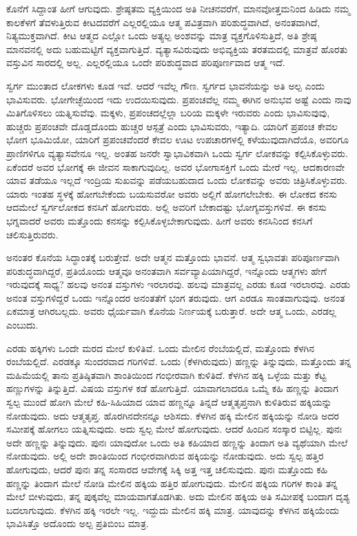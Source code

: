 ಕೊನೆಗೆ ಸಿದ್ದಾಂತ ಹೀಗೆ ಆಗುವುದು. ಶ್ರೇಷ್ಠತಮ ವ್ಯಕ್ತಿಯಿಂದ ಅತಿ ನೀಚನವರೆಗೆ, ಮಾನವೋತ್ತಮನಿಂದ ಹಿಡಿದು ನಮ್ಮ ಕಾಲಕೆಳಗೆ ತೆವಳುತ್ತಿರುವ ಕೀಟದವರೆಗೆ ಎಲ್ಲರಲ್ಲಿಯೂ ಆತ್ಮ ಪವಿತ್ರವಾಗಿ ಪರಿಶುದ್ಧವಾಗಿದೆ, ಅನಂತವಾಗಿದೆ, ನಿತ್ಯಮುಕ್ತವಾಗಿದೆ. ಕೀಟ ಆತ್ಮದ ಎಲ್ಲೋ ಒಂದು ಅತ್ಯಲ್ಪ ಅಂಶವನ್ನು ಮಾತ್ರ ವ್ಯಕ್ತಗೊಳಿಸುತ್ತಿದೆ, ಅತಿ ಶ್ರೇಷ್ಠ ಮಾನವನಲ್ಲಿ ಅದು ಬಹುಮಟ್ಟಿಗೆ ವ್ಯಕ್ತವಾಗುತ್ತಿದೆ. ವ್ಯತ್ಯಾಸವಿರುವುದು ಅಭಿವ್ಯಕ್ತಿಯ ತರತಮದಲ್ಲಿ ಮಾತ್ರವೆ ಹೊರತು ವಸ್ತುವಿನ ಸಾರದಲ್ಲಿ ಅಲ್ಲ. ಎಲ್ಲರಲ್ಲಿಯೂ ಒಂದೇ ಪರಿಶುದ್ಧವಾದ ಪರಿಪೂರ್ಣವಾದ ಆತ್ಮ ಇದೆ.

ಸ್ವರ್ಗ ಮುಂತಾದ ಲೋಕಗಳು ಕೂಡ ಇವೆ. ಆದರೆ ಇವೆಲ್ಲ ಗೌಣ. ಸ್ವರ್ಗದ ಭಾವನೆಯನ್ನು ಅತಿ ಅಲ್ಪ ಎಂದು ಭಾವಿಸುವರು. ಭೋಗೇಚ್ಛೆಯಿಂದ ಇದು ಉದಯಿಸುವುದು. ಪ್ರಪಂಚವೆಲ್ಲ ನಮ್ಮ ಈಗಿನ ಅನುಭವ ಅಷ್ಟೆ ಎಂದು ನಾವು ಮಿತಿಗೊಳಿಸಲು ಯತ್ನಿಸುವೆವು. ಮಕ್ಕಳು, ಪ್ರಪಂಚದಲ್ಲೆಲ್ಲಾ ಬರಿಯ ಮಕ್ಕಳೇ ಇರುವರು ಎಂದು ಭಾವಿಸುವುವು, ಹುಚ್ಚರು ಪ್ರಪಂಚವೇ ದೊಡ್ಡದೊಂದು ಹುಚ್ಚರ ಆಸ್ಪತ್ರೆ ಎಂದು ಭಾವಿಸುವರು, ಇತ್ಯಾದಿ. ಯಾರಿಗೆ ಪ್ರಪಂಚ ಕೇವಲ ಭೋಗ ಭೂಮಿಯೋ, ಯಾರಿಗೆ ಪ್ರಪಂಚವೆಂದರೆ ಕೇವಲ ಊಟ ಉಪಚಾರಗಳಲ್ಲಿ ಕಳೆಯುವುದಾಗಿದೆಯೊ, ಅವರಿಗೂ ಪ್ರಾಣಿಗಳಿಗೂ ವ್ಯತ್ಯಾಸವೇನೂ ಇಲ್ಲ. ಅಂತಹ ಜನರೇ ಸ್ವಾಭಾವಿಕವಾಗಿ ಒಂದು ಸ್ವರ್ಗ ಲೋಕವನ್ನು ಕಲ್ಪಿಸಿಕೊಳ್ಳುವರು. ಏಕೆಂದರೆ ಅವರ ಭೋಗಕ್ಕೆ ಈ ಜೀವನ ಸಾಕಾಗುವುದಿಲ್ಲ. ಅವರ ಭೋಗಾಸಕ್ತಿಗೆ ಒಂದು ಮೇರೆ ಇಲ್ಲ. ಆದಕಾರಣವೇ ಯಾವ ತಡೆಯೂ ಇಲ್ಲದೆ ಇಂದ್ರಿಯ ಸುಖವನ್ನು ಪಡೆಯಬಹುದಾದ ಒಂದು ಲೋಕವನ್ನು ಅವರು ಚಿತ್ರಿಸಿಕೊಳ್ಳುವರು. ಯಾರು ಇಂತಹ ಸ್ಥಳಕ್ಕೆ ಹೋಗಬೇಕೆಂದು ಬಯಸುವರೋ ಅವರು ಅಲ್ಲಿಗೆ ಹೋಗಲೇಬೇಕು. ಈ ಲೋಕದ ಕನಸು ಆದಮೇಲೆ ಸ್ವರ್ಗಲೋಕದ ಕನಸಿಗೆ ಹೋಗುವರು. ಅಲ್ಲಿ ಅವರಿಗೆ ಬೇಕಾದಷ್ಟು ಭೋಗ್ಯವಸ್ತುಗಳಿವೆ. ಈ ಕನಸು ಭಗ್ನವಾದರೆ ಅವರು ಮತ್ತೊಂದು ಕನಸನ್ನು ಕಲ್ಪಿಸಿಕೊಳ್ಳಬೇಕಾಗುವುದು. ಹೀಗೆ ಅವರು ಕನಸಿನಿಂದ ಕನಸಿಗೆ ಚಲಿಸುತ್ತಿರುವರು.

ಅನಂತರ ಕೊನೆಯ ಸಿದ್ಧಾಂತಕ್ಕೆ ಬರುತ್ತೇವೆ. ಅದೇ ಆತ್ಮನ ಮತ್ತೊಂದು ಭಾವನೆ. ಆತ್ಮ ಸ್ವಭಾವತಃ ಪರಿಪೂರ್ಣವಾಗಿ ಪರಿಶುದ್ಧವಾಗಿದ್ದರೆ, ಪ್ರತಿಯೊಂದು ಆತ್ಮವೂ ಅನಂತವಾಗಿ ಸರ್ವವ್ಯಾಪಿಯಾಗಿದ್ದರೆ, ಇನ್ನೊಂದು ಆತ್ಮಗಳು ಹೇಗೆ ಇರುವುದಕ್ಕೆ ಸಾಧ್ಯ? ಹಲವು ಅನಂತ ವಸ್ತುಗಳು ಇರಲಾರವು. ಹಲವು ಮಾತ್ರವಲ್ಲ ಎರಡು ಕೂಡ ಇರಲಾರವು. ಎರಡು ಅನಂತ ವಸ್ತುಗಳಿದ್ದರೆ ಒಂದು ಇನ್ನೊಂದರ ಅನಂತತೆಗೆ ಭಂಗ ತರುವುದು. ಆಗ ಎರಡೂ ಸಾಂತವಾಗುವುವು. ಅನಂತ ಏಕಮಾತ್ರ ಆಗಿರಬಲ್ಲದು. ಅವರು ಧೈರ್ಯವಾಗಿ ಕೊನೆಯ ನಿರ್ಣಯಕ್ಕೆ ಬರುತ್ತಾರೆ. ಅದೇ ಆತ್ಮ ಒಂದು, ಎರಡಲ್ಲ ಎಂಬುದು.

ಎರಡು ಹಕ್ಕಿಗಳು ಒಂದೇ ಮರದ ಮೇಲೆ ಕುಳಿತಿವೆ. ಒಂದು ಮೇಲಿನ ರೆಂಬೆಯಲ್ಲಿದೆ, ಮತ್ತೊಂದು ಕೆಳಗಿನ ರಂಬೆಯಲ್ಲಿದೆ. ಎರಡಕ್ಕೂ ಸುಂದರವಾದ ಗರಿಗಳಿವೆ. ಒಂದು (ಕೆಳಗಿರುವುದು) ಹಣ್ಣನ್ನು ತಿನ್ನುವುದು, ಮತ್ತೊಂದು ತನ್ನ ಮಹಿಮೆಯಲ್ಲಿ ತಾನು ಪ್ರತಿಷ್ಠಿತವಾಗಿ ಶಾಂತಿಯಿಂದ ಗಂಭೀರವಾಗಿ ಕುಳಿತಿದೆ. ಕೆಳಗಿನ ಹಕ್ಕಿ ಒಳ್ಳೆಯ ಮತ್ತು ಕೆಟ್ಟ ಹಣ್ಣುಗಳನ್ನು ತಿನ್ನುತ್ತಿದೆ. ವಿಷಯ ವಸ್ತುಗಳ ಕಡೆ ಹೋಗುತ್ತಿದೆ. ಯಾವಾಗಲಾದರೂ ಒಮ್ಮೆ ಕಹಿ ಹಣ್ಣನ್ನು ತಿಂದಾಗ ಸ್ವಲ್ಪ ಮುಂದೆ ಹೋಗಿ ಮೇಲೆ ಕಹಿ-ಸಿಹಿಯಾದ ಯಾವ ಹಣ್ಣನ್ನೂ ತಿನ್ನದೆ ಆತ್ಮತೃಪ್ತನಾಗಿ ಕುಳಿತಿರುವ ಹಕ್ಕಿಯನ್ನು ನೋಡುವುದು. ಅದು ಆತ್ಮತೃಪ್ತ. ಹೊರಗಿನದೇನನ್ನೂ ಆಶಿಸದು. ಕೆಳಗಿನ ಹಕ್ಕಿ ಮೇಲಿನ ಹಕ್ಕಿಯನ್ನು ನೋಡಿ ಅದರ ಸಮೀಪಕ್ಕೆ ಹೋಗಲು ಯತ್ನಿಸುವುದು. ಅದು ಸ್ವಲ್ಪ ಮೇಲೆ ಹೋಗುವುದು. ಆದರೆ ಹಿಂದಿನ ಸಂಸ್ಕಾರ ಬಿಟ್ಟಿಲ್ಲ. ಪುನಃ ಅದೇ ಹಣ್ಣನ್ನು ತಿನ್ನುವುದು. ಪುನಃ ಯಾವುದೋ ಒಂದು ಅತಿ ಕಹಿಯಾದ ಹಣ್ಣನ್ನು ತಿಂದಾಗ ಅತಿ ವ್ಯಥೆಯಾಗಿ ಮೇಲೆ ನೋಡುವುದು. ಅಲ್ಲಿ ಅದೇ ಶಾಂತಿಯಿಂದ ಗಂಭೀರವಾಗಿರುವ ಹಕ್ಕಿಯನ್ನು ನೋಡುವುದು. ಅದು ಸ್ವಲ್ಪ ಹತ್ತಿರ ಹೋಗುವುದು, ಆದರೆ ಪುನಃ ತನ್ನ ಸಂಸಾರದ ಆವೇಗಕ್ಕೆ ಸಿಕ್ಕಿ ಅತ್ತ ಇತ್ತ ಚಲಿಸುವುದು. ಪುನಃ ಮತ್ತೊಂದು ಕಹಿ ಹಣ್ಣನ್ನು ತಿಂದಾಗ ಮೇಲೆ ನೋಡಿ ಮೇಲಿನ ಹಕ್ಕಿಯ ಹತ್ತಿರ ಹೋಗುವುದು. ಮೇಲಿನ ಹಕ್ಕಿಯ ಗರಿಗಳ ಕಾಂತಿ ತನ್ನ ಮೇಲೆ ಬೀಳುವುದು, ತನ್ನ ಪುಕ್ಕವೆಲ್ಲ ಮಾಯವಾಗತೊಡಗಿತು. ಅದು ಮೇಲಿನ ಹಕ್ಕಿಯ ಅತಿ ಸಮೀಪಕ್ಕೆ ಬಂದಾಗ ದೃಶ್ಯ ಬದಲಾಗುವುದು. ಕೆಳಗಿನ ಹಕ್ಕಿ ಇರಲೇ ಇಲ್ಲ. ಇದ್ದುದು ಮೇಲಿನ ಹಕ್ಕಿ ಮಾತ್ರ. ಯಾವುದನ್ನು ಕೆಳಗಿನ ಹಕ್ಕಿಯೆಂದು ಭಾವಿಸಿತ್ತೊ ಅದೊಂದು ಅಲ್ಪ ಪ್ರತಿಬಿಂಬ ಮಾತ್ರ.

